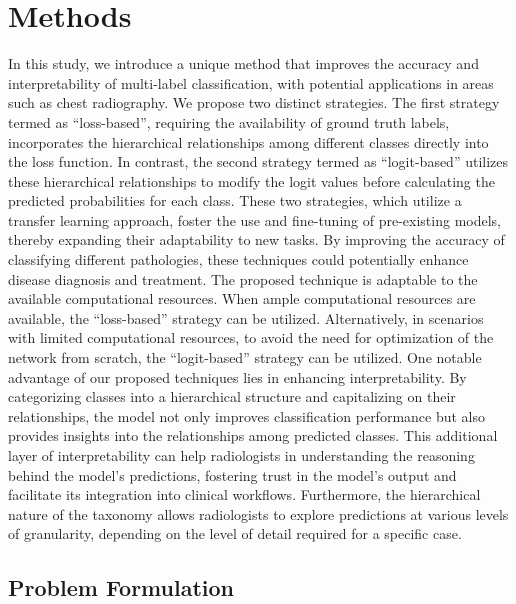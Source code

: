 \documentclass[review,1p,times,numbers]{elsarticle}
\begin{document}
\section{Methods}\label{sec:taxonomy.methods}
In this study, we introduce a unique method that improves the accuracy and interpretability of multi-label classification, with potential applications in areas such as chest radiography. We propose two distinct strategies. The first strategy termed as ``loss-based'', requiring the availability of ground truth labels, incorporates the hierarchical relationships among different classes directly into the loss function. In contrast, the second strategy termed as ``logit-based'' utilizes these hierarchical relationships to modify the logit values before calculating the predicted probabilities for each class. These two strategies, which utilize a transfer learning approach, foster the use and fine-tuning of pre-existing models, thereby expanding their adaptability to new tasks. By improving the accuracy of classifying different pathologies, these techniques could potentially enhance disease diagnosis and treatment.
The proposed technique is adaptable to the available computational resources. When ample computational resources are available, the ``loss-based'' strategy can be utilized. Alternatively, in scenarios with limited computational resources, to avoid the need for optimization of the network from scratch, the ``logit-based'' strategy can be utilized.
One notable advantage of our proposed techniques lies in enhancing interpretability. By categorizing classes into a hierarchical structure and capitalizing on their relationships, the model not only improves classification performance but also provides insights into the relationships among predicted classes.
This additional layer of interpretability can help radiologists in understanding the reasoning behind the model's predictions, fostering trust in the model's output and facilitate its integration into clinical workflows. Furthermore, the hierarchical nature of the taxonomy allows radiologists to explore predictions at various levels of granularity, depending on the level of detail required for a specific case.

\subsection{Problem Formulation}\label{subsec:taxonomy.problem_formulation}
\end{document}
